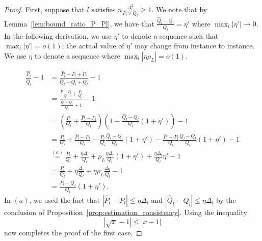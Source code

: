 \documentclass{article}
\begin{document}
\begin{proof}
First, suppose that $l$ satisfies $n \frac{\Delta_l^2}{P_l \vee Q_l} \geq 1$. We note that by Lemma~\ref{lem:bound_ratio_P_Pl}, we have that $ \frac{\hat{Q}_l - Q_l}{Q_l} = \eta'$ where $\max_l |\eta'| \rightarrow 0$. In the following derivation, we use $\eta'$ to denote a sequence such that $\max_l |\eta'| = o(1)$; the actual value of $\eta'$ may change from instance to instance. We use $\eta$ to denote a sequence where $\max_l |\eta \rho_L| = o(1)$.

\begin{align*}
\frac{\hat{P}_l}{\hat{Q}_l} - 1&= 
      \frac{ \hat{P}_l - P_l + P_l }{ \hat{Q}_l - Q_l + Q_l} -1 \\
  &= \frac{  \frac{\hat{P}_l - P_l}{Q_l} + \frac{P_l}{Q_l}}
       { \frac{\hat{Q}_l - Q_l}{Q_l} + 1} - 1 \\
 &= \left( \frac{P_l}{Q_l} + \frac{\hat{P}_l - P_l}{Q_l} \right)
    \left( 1 - \frac{\hat{Q}_l - Q_l}{Q_l} (1 + \eta')  \right) -1  \\
 &= \frac{P_l}{Q_l} + \frac{\hat{P}_l - P_l}{Q_l} 
     - \frac{P_l}{Q_l} \frac{\hat{Q}_l - Q_l}{Q_l} (1 + \eta') 
     - \frac{\hat{P}_l - P_l}{Q_l} \frac{\hat{Q}_l - Q_l}{Q_l}(1+ \eta') 
   - 1 \\
 &\stackrel{(a)}= \frac{P_l}{Q_l} + \frac{\eta \Delta_l}{Q_l} 
     + \rho_L \frac{\eta \Delta_l}{Q_l} (1+\eta') + \frac{\eta \Delta_l}{Q_l} \eta' 
   - 1 \\
 &= \frac{P_l}{Q_l} + \eta \frac{\Delta_l}{Q_l}
     + \eta \rho_L \frac{\Delta_l}{Q_l}
   - 1 \\
 &= \frac{P_l - Q_l}{Q_l} ( 1 + \eta').
\end{align*}
In $(a)$,  we used the fact that $| \hat{P}_l - P_l| \leq \eta \Delta_l$ and $| \hat{Q}_l - Q_l| \leq \eta \Delta_l$ by the conclusion of Proposition~\ref{prop:estimation_consistency}. Using the inequality 
$$|\sqrt{x} - 1| \leq |x-1|$$ 
now completes the proof of the first case.


\end{proof}
\end{document}
